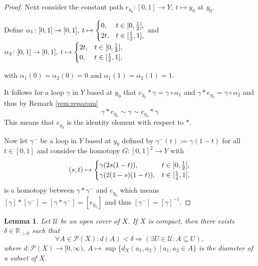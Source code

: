 \documentclass[a4paper, 11pt, twoside]{article}
\newcommand{\R}[0]{\mathbb{R}}
\theoremstyle{break}
\theoremstyle{break}
\newtheorem{lemma}[thm]{Lemma}
\begin{document}
\begin{proof}
  Next consider the constant path $e_{y_0}\colon [0,1] \to Y, \: t \mapsto y_0$ at $y_0$. 
  
  \vspace*{5pt}
  Define $\alpha_1\colon [0,1] \to [0,1], \: t \mapsto \begin{cases}
    0, &t\in[0, {1\over2}],\\
    2t, &t\in[{1\over2}, 1],
  \end{cases}$ and $\alpha_2\colon [0,1]\to [0,1], \: t \mapsto \begin{cases}
    2t, &t\in[0, {1\over2}],\\
    0, &t\in[{1\over2}, 1],
  \end{cases}$

  with $\alpha_1(0) = \alpha_2(0) = 0$ and $\alpha_1(1) = \alpha_2(1) = 1$.

  It follows for a loop $\gamma$ in $Y$ based at $y_0$ that $e_{y_0} * \gamma = \gamma \circ \alpha_1$ and $\gamma * e_{y_0} = \gamma \circ \alpha_2$ and thus by Remark \ref{rem:reparam}
  \begin{equation*}
    \gamma * e_{y_0} \sim \gamma \sim e_{y_0} * \gamma
  \end{equation*}
  This means that $e_{y_0}$ is the identity element with respect to $*$.

  Now let $\gamma^-$ be a loop in $Y$ based at $y_0$ defined by $\gamma^-(t) := \gamma(1 - t)$ for all $t \in [0,1]$ and consider the homotopy $G\colon [0,1]^2 \to Y$ with 
  \begin{equation*}
    (s, t) \mapsto \begin{cases}
      \gamma(2s(1-t)), &t \in [0, {1\over2}], \\
      \gamma(2(1-s)(1-t)), &t \in [{1\over2}, 1],
    \end{cases}
  \end{equation*}
  is a homotopy between $\gamma * \gamma^-$ and $e_{y_0}$ which means $[\gamma] * [\gamma^-] = [\gamma * \gamma^-] = [e_{y_0}]$ and thus $[\gamma^-] = [\gamma]^{-1}$. 
\end{proof}

\begin{lemma}\label{lem:lesbesgue}
  Let $\mathcal{U}$ be an open cover of $X$. If $X$ is compact, then there exists $\delta \in \R_{>0}$ such that
  \begin{equation*}
    \forall A \in \mathcal{P}(X)\colon d(A) < \delta \Rightarrow (\exists U \in \mathcal{U}\colon A \subseteq U),
  \end{equation*}
  where $d\colon \mathcal{P}(X) \to [0, \infty), \: A \mapsto \sup \{ d_X(a_1, a_2) \: | \: a_1,a_2\in A \}$ is the diameter of a subset of $X$.
\end{lemma}
\end{document}
